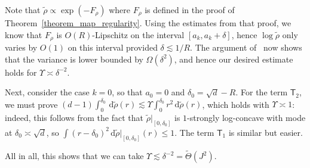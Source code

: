 \documentclass[twoside]{article}
\newcommand{\1}{\mathds{1}}
\newcommand*{\rd}{\mathrm{d}}
\newcommand*{\dd}{\, \rd}
\theoremstyle{plain}
\theoremstyle{definition}
\theoremstyle{remark}
\renewcommand{\tilde}{\widetilde}
\begin{document}
Note that $\tilde\rho \propto \exp(-F_\rho)$ where $F_\rho$ is defined in the proof of Theorem~\ref{theorem_map_regularity}.
Using the estimates from that proof, we know that $F_\rho$ is $O(R)$-Lipschitz on the interval $[a_k,a_k+\delta]$, hence $\log\tilde\rho$ only varies by $O(1)$ on this interval provided $\delta \lesssim 1/R$.
The argument of~\citet[Lemma 5.13]{JiaChePoo24MFVI} now shows that the variance is lower bounded by $\Omega(\delta^2)$, and hence our desired estimate holds for $\Upsilon \asymp \delta^{-2}$.

Next, consider the case $k=0$, so that $a_0 = 0$ and $\delta_0 = \sqrt d - R$.
For the term $\mathsf T_2$, we must prove $(d-1) \int_0^{\delta_0} \dd\tilde\rho(r) \lesssim \Upsilon \int_0^{\delta_0} r^2 \dd\tilde\rho(r)$, which holds with $\Upsilon \asymp 1$: indeed, this follows from the fact that $\tilde\rho|_{[0,\delta_0]}$ is $1$-strongly log-concave with mode at $\delta_0 \asymp \sqrt d$, so $\int (r-\delta_0)^2\dd\tilde\rho|_{[0,\delta_0]}(r)\le 1$.
The term $\mathsf T_1$ is similar but easier.

All in all, this shows that we can take $\Upsilon \lesssim \delta^{-2} = \widetilde\Theta(J^2)$.
\end{document}
